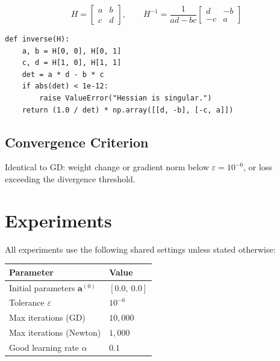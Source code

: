 \documentclass[12pt,a4paper]{article}
\begin{document}
\begin{equation}
    H = \begin{bmatrix} a & b \\ c & d \end{bmatrix}, \qquad
    H^{-1} = \frac{1}{ad - bc} \begin{bmatrix} d & -b \\ -c & a \end{bmatrix}
\end{equation}

\begin{lstlisting}[caption={Analytical 2x2 matrix inverse (newton.py)}]
def inverse(H):
    a, b = H[0, 0], H[0, 1]
    c, d = H[1, 0], H[1, 1]
    det = a * d - b * c
    if abs(det) < 1e-12:
        raise ValueError("Hessian is singular.")
    return (1.0 / det) * np.array([[d, -b], [-c, a]])
\end{lstlisting}

\subsection{Convergence Criterion}

Identical to GD: weight change or gradient norm below $\varepsilon = 10^{-6}$,
or loss exceeding the divergence threshold.

\section{Experiments}
\label{sec:experiments}

All experiments use the following shared settings unless stated otherwise:

\begin{center}
\begin{tabular}{ll}
    \toprule
    Parameter & Value \\
    \midrule
    Initial parameters $\mathbf{a}^{(0)}$ & $[0.0,\ 0.0]$ \\
    Tolerance $\varepsilon$ & $10^{-6}$ \\
    Max iterations (GD) & $10{,}000$ \\
    Max iterations (Newton) & $1{,}000$ \\
    Good learning rate $\alpha$ & $0.1$ \\
    \bottomrule
\end{tabular}
\end{center}
\end{document}
